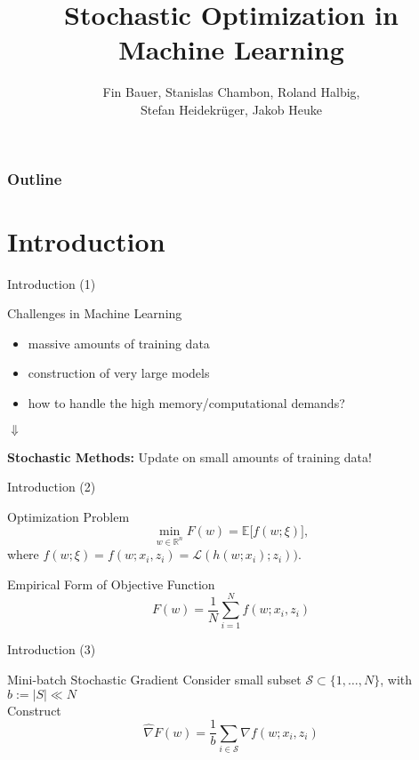 \documentclass[11pt]{beamer}
\author{Fin Bauer, Stanislas Chambon, Roland Halbig, \\Stefan Heidekrüger, Jakob Heuke}
\title{Stochastic Optimization in Machine Learning}
\institute{Technische Universität München}
\begin{document}
	
	\maketitle
	
	\begin{frame}
		\frametitle{Outline}
		\tableofcontents
	\end{frame}
	
	
	\section{Introduction}
	
	\begin{frame}{Introduction (1)}
		\begin{block}{Challenges in Machine Learning}
			\begin{itemize}
				\item massive amounts of training data 
				\item construction of very large models
				\item how to handle the high memory/computational demands?
			\end{itemize}
		\end{block}
		
		\begin{center}
			\huge{   $\Downarrow$ }
		\end{center}  
		\textbf{Stochastic Methods:} Update on small amounts of training data!
	\end{frame}
	
	\begin{frame}{Introduction (2)}
		\begin{block}{Optimization Problem}
			\begin{equation*}
				\min_{w\in \mathbb{R}^n} F(w) = \mathbb{E} \lbrack f(w; \xi) \rbrack,
			\end{equation*}
			where $f(w; \xi) = f(w; x_i, z_i)=\mathcal{L}(h(w; x_i); z_i))$.
		\end{block}
		\begin{block}{Empirical Form of Objective Function}
			\begin{equation*}
				F(w) = \frac{1}{N} \sum_{i = 1}^N f(w; x_i, z_i)
			\end{equation*}
		\end{block}
	\end{frame}
	
	\begin{frame}{Introduction (3)}
		\begin{block}{Mini-batch Stochastic Gradient}
			Consider small subset $\mathcal{S} \subset \{1, \dots, N\}$, with $b := |S| \ll N$ \\
			\vspace{0.3cm}
			Construct
			\begin{equation*}
				\widehat{\nabla} F(w)=\frac{1}{b} \sum_{i \in \mathcal{S} } \nabla f(w; x_i, z_i)
			\end{equation*}
		\end{block}
	\end{frame}	
	
\end{document}
